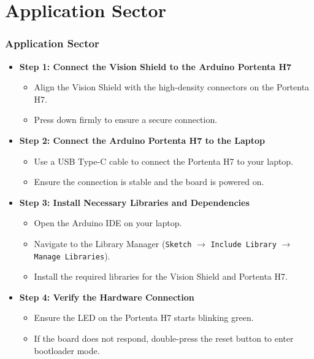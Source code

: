 \documentclass[10pt, a4paper]{beamer}
\begin{document}
	\section{Application Sector}
	\begin{frame}
		\frametitle{Application Sector}
		
		\begin{itemize}
			\item \textbf{Step 1: Connect the Vision Shield to the Arduino Portenta H7}
			\begin{itemize}
				\item Align the Vision Shield with the high-density connectors on the Portenta H7.
				\item Press down firmly to ensure a secure connection.
			\end{itemize}
			
			\item \textbf{Step 2: Connect the Arduino Portenta H7 to the Laptop}
			\begin{itemize}
				\item Use a USB Type-C cable to connect the Portenta H7 to your laptop.
				\item Ensure the connection is stable and the board is powered on.
			\end{itemize}
			
			\item \textbf{Step 3: Install Necessary Libraries and Dependencies}
			\begin{itemize}
				\item Open the Arduino IDE on your laptop.
				\item Navigate to the Library Manager (\texttt{Sketch} $\rightarrow$ \texttt{Include Library} $\rightarrow$ \texttt{Manage Libraries}).
				\item Install the required libraries for the Vision Shield and Portenta H7.
			\end{itemize}
			
			\item \textbf{Step 4: Verify the Hardware Connection}
			\begin{itemize}
				\item Ensure the LED on the Portenta H7 starts blinking green.
				\item If the board does not respond, double-press the reset button to enter bootloader mode.
			\end{itemize}
		\end{itemize}
		
	\end{frame}
	
\end{document}
